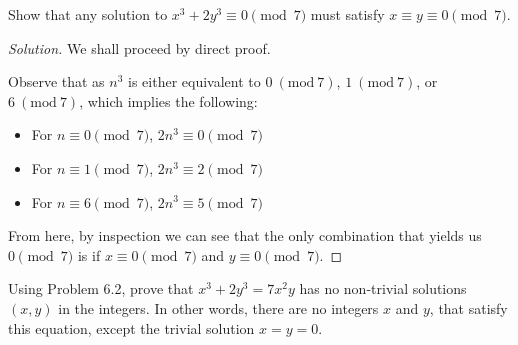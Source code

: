 \documentclass{article}
\newenvironment{solution}{\begin{proof}[Solution]}{\end{proof}}
\newcommand{\Mod}[1]{\ (\mathrm{mod}\ {#1})}
\begin{document}
\begin{hw}
	Show that any solution to $x^3 + 2y^3 \equiv 0 \pmod{7}$ must satisfy $x \equiv y \equiv 0 \pmod{7}$.
\end{hw}
\begin{solution}
%	
%		
%
%	
	We shall proceed by direct proof.
	
	Observe that as $n^{3}$ is either equivalent to $0 \Mod{7}$, $1 \Mod{7}$, or $6 \Mod{7}$, which implies the following:
	\begin{itemize}
		\item For $n \equiv 0 \pmod 7$, $2n^{3} \equiv 0 \pmod 7$
		\item For $n \equiv 1 \pmod 7$, $2n^{3} \equiv 2 \pmod 7$
		\item For $n \equiv 6 \pmod 7$, $2n^{3} \equiv 5 \pmod 7$
	\end{itemize}

	From here, by inspection we can see that the only combination that yields us $0 \pmod 7$ is if $x \equiv 0 \pmod 7$ and $y \equiv 0 \pmod 7$.
\end{solution}
\begin{hw}
	Using Problem 6.2, prove that $x^3 + 2y^3 = 7x^2 y$ has no non-trivial solutions $(x, y)$ in the integers. In other words, there are no integers $x$ and $y$, that satisfy this equation, except the trivial solution $x=y=0$.
\end{hw}
\end{document}

